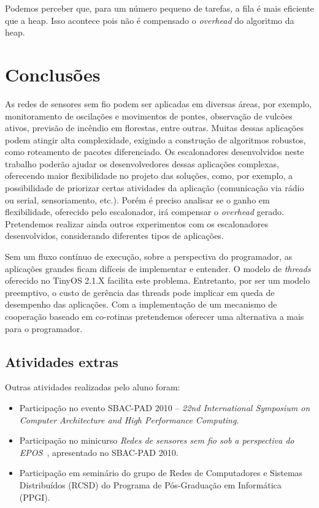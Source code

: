 \documentclass[a4paper, 10pt]{article}
\begin{document}
Podemos perceber que, para um número pequeno de tarefas, a fila é mais eficiente que a heap. Isso acontece pois
não é compensado o \textit{overhead} do algoritmo da heap.

\section{Conclusões}\label{conclusoes}
As redes de sensores sem fio podem ser aplicadas em diversas áreas, por exemplo, monitoramento de oscilações 
e movimentos de pontes, observação de vulcões ativos, previsão de incêndio em florestas, entre outras. 
Muitas dessas aplicações podem atingir alta complexidade, exigindo a construção de algoritmos robustos, 
como roteamento de pacotes diferenciado.
Os escalonadores desenvolvidos neste trabalho poderão ajudar os desenvolvedores dessas aplicações complexas,
oferecendo maior flexibilidade no projeto das soluções, como, por exemplo, 
a possibilidade de priorizar certas atividades da aplicação (comunicação via rádio ou serial, sensoriamento, etc.).
Porém é preciso analisar se o ganho em flexibilidade, oferecido pelo escalonador, irá compensar o
\textit{overhead} gerado.
Pretendemos realizar ainda outros experimentos com os escalonadores desenvolvidos, considerando diferentes
tipos de aplicações. 

Sem um fluxo contínuo de execução, sobre a perspectiva do programador, as aplicações grandes ficam difíceis de
implementar e entender. O modelo de \textit{threads} oferecido no 
TinyOS 2.1.X\cite{TEP134} facilita este problema. Entretanto, por ser um modelo preemptivo, o custo de
gerência das threads pode implicar em queda de desempenho das aplicações. 
Com a implementação de um mecanismo de cooperação baseado em co-rotinas pretendemos
oferecer uma alternativa a mais para o programador.


\subsection{Atividades extras}
Outras atividades realizadas pelo aluno foram:
\begin{itemize}
    \item Participação no evento SBAC-PAD 2010 -- 
{\em 22nd International Symposium on Computer Architecture and High Performance Computing}.
    \item Participação no minicurso 
{\em Redes de sensores sem fio sob a perspectiva do EPOS}~\cite{HoellerFrohlich/10}, 
apresentado no SBAC-PAD 2010.    
    \item Participação em seminário do grupo de Redes de Computadores e Sistemas Distribuídos (RCSD)
do Programa de Pós-Graduação em Informática (PPGI).
\end{itemize}
\end{document}
